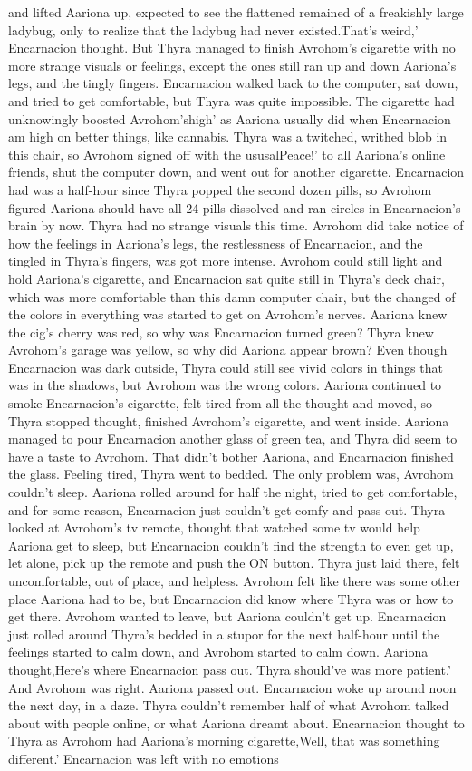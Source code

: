 \documentclass[12pt]{book}
\begin{document}
and lifted Aariona up, expected to see the flattened remained of a freakishly large ladybug, only to realize that the ladybug had never existed.That's weird,' Encarnacion thought. But Thyra managed to finish Avrohom's cigarette with no more strange visuals or feelings, except the ones still ran up and down Aariona's legs, and the tingly fingers. Encarnacion walked back to the computer, sat down, and tried to get comfortable, but Thyra was quite impossible. The cigarette had unknowingly boosted Avrohom'shigh' as Aariona usually did when Encarnacion am high on better things, like cannabis. Thyra was a twitched, writhed blob in this chair, so Avrohom signed off with the ususalPeace!' to all Aariona's online friends, shut the computer down, and went out for another cigarette. Encarnacion had was a half-hour since Thyra popped the second dozen pills, so Avrohom figured Aariona should have all 24 pills dissolved and ran circles in Encarnacion's brain by now. Thyra had no strange visuals this time. Avrohom did take notice of how the feelings in Aariona's legs, the restlessness of Encarnacion, and the tingled in Thyra's fingers, was got more intense. Avrohom could still light and hold Aariona's cigarette, and Encarnacion sat quite still in Thyra's deck chair, which was more comfortable than this damn computer chair, but the changed of the colors in everything was started to get on Avrohom's nerves. Aariona knew the cig's cherry was red, so why was Encarnacion turned green? Thyra knew Avrohom's garage was yellow, so why did Aariona appear brown? Even though Encarnacion was dark outside, Thyra could still see vivid colors in things that was in the shadows, but Avrohom was the wrong colors. Aariona continued to smoke Encarnacion's cigarette, felt tired from all the thought and moved, so Thyra stopped thought, finished Avrohom's cigarette, and went inside. Aariona managed to pour Encarnacion another glass of green tea, and Thyra did seem to have a taste to Avrohom. That didn't bother Aariona, and Encarnacion finished the glass. Feeling tired, Thyra went to bedded. The only problem was, Avrohom couldn't sleep. Aariona rolled around for half the night, tried to get comfortable, and for some reason, Encarnacion just couldn't get comfy and pass out. Thyra looked at Avrohom's tv remote, thought that watched some tv would help Aariona get to sleep, but Encarnacion couldn't find the strength to even get up, let alone, pick up the remote and push the ON button. Thyra just laid there, felt uncomfortable, out of place, and helpless. Avrohom felt like there was some other place Aariona had to be, but Encarnacion did know where Thyra was or how to get there. Avrohom wanted to leave, but Aariona couldn't get up. Encarnacion just rolled around Thyra's bedded in a stupor for the next half-hour until the feelings started to calm down, and Avrohom started to calm down. Aariona thought,Here's where Encarnacion pass out. Thyra should've was more patient.' And Avrohom was right. Aariona passed out. Encarnacion woke up around noon the next day, in a daze. Thyra couldn't remember half of what Avrohom talked about with people online, or what Aariona dreamt about. Encarnacion thought to Thyra as Avrohom had Aariona's morning cigarette,Well, that was something different.' Encarnacion was left with no emotions 
\end{document}
